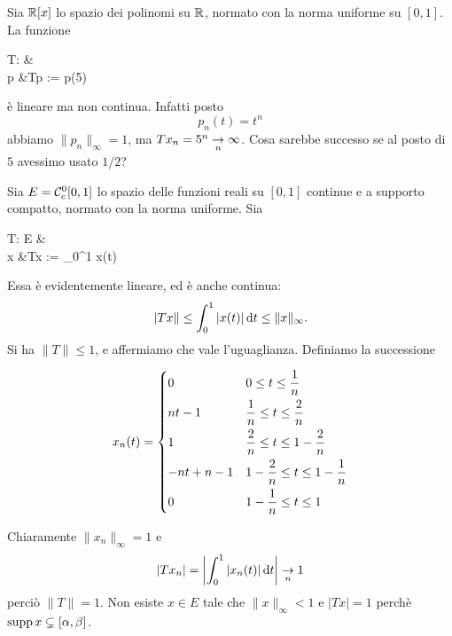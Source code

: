 \begin{example}
	Sia $\R[x]$ lo spazio dei polinomi su $\R$, normato con la norma uniforme su $[0,1]$. La funzione
	\begin{eqalign}
		T: \R[x] &\longto \R\\
		p &\longmapsto Tp := p(5)
	\end{eqalign}
	è lineare ma non continua. Infatti posto
	$$
		p_n(t) = t^n
	$$
	abbiamo $\|p_n\|_\infty = 1$, ma $Tx_n = 5^n \conv[n] \infty$. Cosa sarebbe successo se al posto di $5$ avessimo usato $1/2$?
\end{example}
\begin{example}
	Sia $E=\Czero_c[0,1]$ lo spazio delle funzioni reali su $[0,1]$ continue e a supporto compatto, normato con la norma uniforme. Sia
	\begin{eqalign}
		T: E &\longto \R\\
		x &\longmapsto Tx := \int_0^1 x(t)\,\dt
	\end{eqalign}
	Essa è evidentemente lineare, ed è anche continua:
	$$
		|Tx\| \leq \int_0^1 |x(t)|\,\dt \leq \|x\|_\infty.
	$$
	Si ha $\|T\| \leq 1$, e affermiamo che vale l'uguaglianza.
	Definiamo la successione

	\begin{minipage}[c]{\textwidth}
		\begin{minipage}[c]{.48\textwidth}
			$$
				x_n(t) = \begin{dcases}
					0 & 0 \leq t \leq \frac1n\\
					nt-1 & \frac1n \leq t \leq \frac2n\\
					1 & \frac2n \leq t \leq 1-\frac2n\\
					-nt+n-1 & 1-\frac2n \leq t \leq 1-\frac1n\\
					0 & 1-\frac1n \leq t \leq 1
				\end{dcases}
			$$
		\end{minipage}%
		\begin{minipage}[c]{.48\textwidth}
			\begin{figure}[H]
				\centering
			\end{figure}
		\end{minipage}
	\end{minipage}
	\vspace{3ex}

	Chiaramente $\|x_n\|_\infty = 1$ e
	$$
		|Tx_n| = \left| \int_0^1 |x_n(t)|\,\dt \right| \conv[n] 1
	$$
	perciò $\|T\|=1$. Non esiste $x \in E$ tale che $\|x\|_\infty < 1$ e $|Tx| =1$ perchè $\supp x \subsetneq [\alpha, \beta]$.
\end{example}

